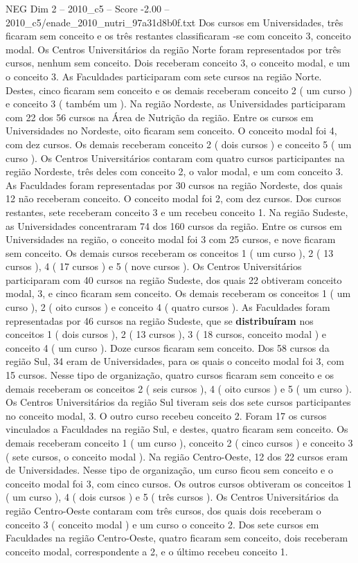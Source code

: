 \begin{textsample}{NEG Dim 2 – 2010\_c5 – Score -2.00 – 2010\_c5/enade\_2010\_nutri\_97a31d8b0f.txt}
Dos cursos em Universidades, três ficaram sem conceito e os três restantes classificaram -se com conceito 3, conceito modal.
Os Centros Universitários da região Norte foram representados por três cursos, nenhum sem conceito.
Dois receberam conceito 3, o conceito modal, e um o conceito 3.
As Faculdades participaram com sete cursos na região Norte.
Destes, cinco ficaram sem conceito e os demais receberam conceito 2 ( um curso ) e conceito 3 ( também um ).
Na região Nordeste, as Universidades participaram com 22 dos 56 cursos na Área de Nutrição da região.
Entre os cursos em Universidades no Nordeste, oito ficaram sem conceito.
O conceito modal foi 4, com dez cursos.
Os demais receberam conceito 2 ( dois cursos ) e conceito 5 ( um curso ).
Os Centros Universitários contaram com quatro cursos participantes na região Nordeste, três deles com conceito 2, o valor modal, e um com conceito 3.
As Faculdades foram representadas por 30 cursos na região Nordeste, dos quais 12 não receberam conceito.
O conceito modal foi 2, com dez cursos.
Dos cursos restantes, sete receberam conceito 3 e um recebeu conceito 1.
Na região Sudeste, as Universidades concentraram 74 dos 160 cursos da região.
Entre os cursos em Universidades na região, o conceito modal foi 3 com 25 cursos, e nove ficaram sem conceito.
Os demais cursos receberam os conceitos 1 ( um curso ), 2 ( 13 cursos ), 4 ( 17 cursos ) e 5 ( nove cursos ).
Os Centros Universitários participaram com 40 cursos na região Sudeste, dos quais 22 obtiveram conceito modal, 3, e cinco ficaram sem conceito.
Os demais receberam os conceitos 1 ( um curso ), 2 ( oito cursos ) e conceito 4 ( quatro cursos ).
As Faculdades foram representadas por 46 cursos na região Sudeste, que se \textbf{distribuíram} nos conceitos 1 ( dois cursos ), 2 ( 13 cursos ), 3 ( 18 cursos, conceito modal ) e conceito 4 ( um curso ).
Doze cursos ficaram sem conceito.
Dos 58 cursos da região Sul, 34 eram de Universidades, para os quais o conceito modal foi 3, com 15 cursos.
Nesse tipo de organização, quatro cursos ficaram sem conceito e os demais receberam os conceitos 2 ( seis cursos ), 4 ( oito cursos ) e 5 ( um curso ).
Os Centros Universitários da região Sul tiveram seis dos sete cursos participantes no conceito modal, 3.
O outro curso recebeu conceito 2.
Foram 17 os cursos vinculados a Faculdades na região Sul, e destes, quatro ficaram sem conceito.
Os demais receberam conceito 1 ( um curso ), conceito 2 ( cinco cursos ) e conceito 3 ( sete cursos, o conceito modal ).
Na região Centro-Oeste, 12 dos 22 cursos eram de Universidades.
Nesse tipo de organização, um curso ficou sem conceito e o conceito modal foi 3, com cinco cursos.
Os outros cursos obtiveram os conceitos 1 ( um curso ), 4 ( dois cursos ) e 5 ( três cursos ).
Os Centros Universitários da região Centro-Oeste contaram com três cursos, dos quais dois receberam o conceito 3 ( conceito modal ) e um curso o conceito 2.
Dos sete cursos em Faculdades na região Centro-Oeste, quatro ficaram sem conceito, dois receberam conceito modal, correspondente a 2, e o último recebeu conceito 1.

\end{textsample}
